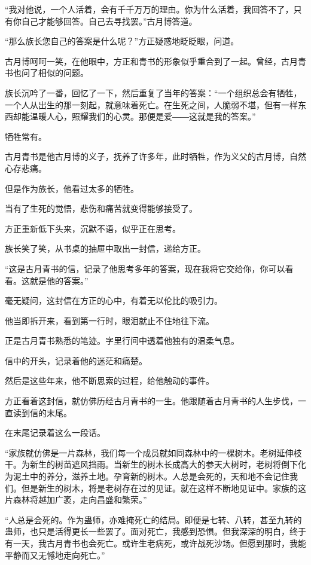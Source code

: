 
\begin{this_body}

“我对他说，一个人活着，会有千千万万的理由。你为什么活着，我回答不了，只有你自己才能够回答。自己去寻找罢。”古月博答道。

“那么族长您自己的答案是什么呢？”方正疑惑地眨眨眼，问道。

古月博呵呵一笑，在他眼中，方正和青书的形象似乎重合到了一起。曾经，古月青书也问了相似的问题。

族长沉吟了一番，回忆了一下，然后重复了当年的答案：“一个组织总会有牺牲，一个人从出生的那一刻起，就意味着死亡。在生死之间，人脆弱不堪，但有一样东西却能温暖人心，照耀我们的心灵。那便是爱――这就是我的答案。”

牺牲常有。

古月青书是他古月博的义子，抚养了许多年，此时牺牲，作为义父的古月博，自然心存悲痛。

但是作为族长，他看过太多的牺牲。

当有了生死的觉悟，悲伤和痛苦就变得能够接受了。

方正重新低下头来，沉默不语，似乎正在思考。

族长笑了笑，从书桌的抽屉中取出一封信，递给方正。

“这是古月青书的信，记录了他思考多年的答案，现在我将它交给你，你可以看看。这就是他的答案。”

毫无疑问，这封信在方正的心中，有着无以伦比的吸引力。

他当即拆开来，看到第一行时，眼泪就止不住地往下流。

正是古月青书熟悉的笔迹。字里行间中透着他独有的温柔气息。

信中的开头，记录着他的迷茫和痛楚。

然后是这些年来，他不断思索的过程，给他触动的事件。

方正看着这封信，就仿佛历经古月青书的一生。他跟随着古月青书的人生步伐，一直读到信的末尾。

在末尾记录着这么一段话。

“家族就仿佛是一片森林，我们每一个成员就如同森林中的一棵树木。老树延伸枝干。为新生的树苗遮风挡雨。当新生的树木长成高大的参天大树时，老树将倒下化为泥土中的养分，滋养土地。孕育新的树木。人总是会死的，天和地不会记住我们。但是新生的树木，将是老树存在过的见证。就在这样不断地见证中。家族的这片森林将越加广袤，走向昌盛和繁荣。”

“人总是会死的。作为蛊师，亦难掩死亡的结局。即便是七转、八转，甚至九转的蛊师，也只是活得更长一些罢了。面对死亡，我感到恐惧。但我深深的明白，终于有一天，我古月青书也会死亡。或许生老病死，或许战死沙场。但愿到那时，我能平静而又无憾地走向死亡。”


\end{this_body}
